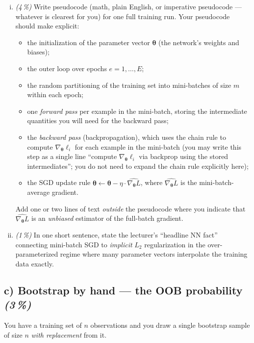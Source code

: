 \documentclass[11pt,a4paper]{article}
\newcommand{\subpoints}[1]{\textit{(#1\,\%)}}
\begin{document}
\begin{enumerate}[(i)]
  \item \subpoints{4} Write pseudocode (math, plain English, or imperative pseudocode --- whatever is clearest for you) for one full training run. Your pseudocode should make explicit:
  \begin{itemize}
    \item the initialization of the parameter vector $\bm\theta$ (the network's weights and biases);
    \item the outer loop over epochs $e = 1, \dots, E$;
    \item the random partitioning of the training set into mini-batches of size $m$ within each epoch;
    \item one \emph{forward pass} per example in the mini-batch, storing the intermediate quantities you will need for the backward pass;
    \item the \emph{backward pass} (backpropagation), which uses the chain rule to compute $\nabla_{\bm\theta} \ell_i$ for each example in the mini-batch (you may write this step as a single line ``compute $\nabla_{\bm\theta}\ell_i$ via backprop using the stored intermediates''; you do not need to expand the chain rule explicitly here);
    \item the SGD update rule $\bm\theta \leftarrow \bm\theta - \eta \cdot \widehat{\nabla_{\bm\theta} L}$, where $\widehat{\nabla_{\bm\theta} L}$ is the mini-batch-average gradient.
  \end{itemize}
  Add one or two lines of text \emph{outside} the pseudocode where you indicate that $\widehat{\nabla_{\bm\theta} L}$ is an \emph{unbiased} estimator of the full-batch gradient.

  \item \subpoints{1} In one short sentence, state the lecturer's ``headline NN fact'' connecting mini-batch SGD to \emph{implicit} $L_2$ regularization in the over-parameterized regime where many parameter vectors interpolate the training data exactly.
\end{enumerate}

\subsection*{c) Bootstrap by hand --- the OOB probability \subpoints{3}}

You have a training set of $n$ observations and you draw a single bootstrap sample of size $n$ \emph{with replacement} from it.
\end{document}
